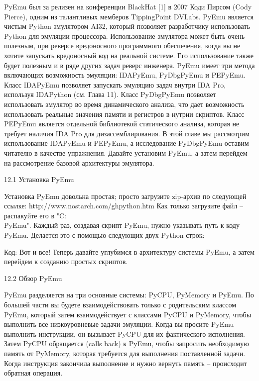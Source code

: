 \documentclass[12pt]{book}
\begin{document}
PyEmu был за релизен на конференции BlackHat [1] в 2007 Коди Пирсом (Cody Pierce), одним из талантливых мемберов TippingPoint DVLabs. PyEmu является чистым Python эмулятором AI32, который позволяет разработчику использовать Python для эмуляции процессора. Использование эмулятора может быть очень полезным, при реверсе вредоносного программного обеспечения, когда вы не хотите запускать вредоносный код на реальной системе. Его использование также будет полезным и в ряде других задач реверс инженера. PyEmu имеет три метода включающих возможность эмуляции: IDAPyEmu, PyDbgPyEmu и PEPyEmu. Класс IDAPyEmu позволяет запускать эмуляцию задач внутри IDA Pro, используя IDAPython (см. Глава 11). Класс PyDbgPyEmu позволяет использовать эмулятор во время динамического анализа, что дает возможность использовать реальные значения памяти и регистров в нутрии скриптов. Класс PEPyEmu является отдельной библиотекой статического анализа, которая не требует наличия IDA Pro для дизассемблирования. В этой главе мы рассмотрим использование IDAPyEmu и PEPyEmu, а исследование PyDbgPyEmu оставим читателю в качестве упражнения. Давайте установим PyEmu, а затем перейдем на рассмотрение базовой архитектуры эмулятора.


12.1 Установка PyEmu

Установка PyEmu довольна простая; просто загрузите zip-архив по следующей ссылке:
http://www.nostarch.com/ghpython.htm
Как только загрузите файл – распакуйте его в "C:\\PyEmu". Каждый раз, создавая скрипт PyEmu, нужно указывать путь к коду PyEmu. Делается это с помощью следующих двух Python строк:

Код:
Вот и все! Теперь давайте углубимся в архитектуру системы PyEmu, а затем перейдем к созданию простых скриптов.


12.2 Обзор PyEmu

PyEmu разделяется на три основные системы: PyCPU, PyMemory и PyEmu. По большей части вы будете взаимодействовать только с родительским классом PyEmu, который затем взаимодействует с классами PyCPU и PyMemory, чтобы выполнить все низкоуровневые задачи эмуляции. Когда вы просите PyEmu выполнить инструкции, он вызывает PyCPU для их фактического исполнения. Затем PyCPU обращается (calls back) к PyEmu, чтобы запросить необходимую память от PyMemory, которая требуется для выполнения поставленной задачи. Когда инструкция закончила выполнение и нужно вернуть память – происходит обратная операция.
\end{document}
